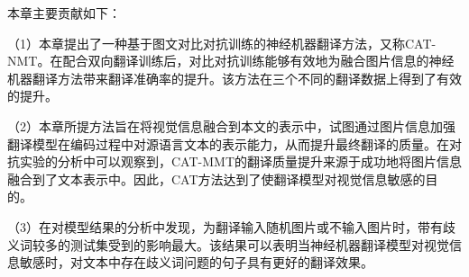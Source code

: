 本章主要贡献如下：

（1）本章提出了一种基于图文对比对抗训练的神经机器翻译方法，又称CAT-NMT。在配合双向翻译训练后，对比对抗训练能够有效地为融合图片信息的神经机器翻译方法带来翻译准确率的提升。该方法在三个不同的翻译数据上得到了有效的提升。

（2）本章所提方法旨在将视觉信息融合到本文的表示中，试图通过图片信息加强翻译模型在编码过程中对源语言文本的表示能力，从而提升最终翻译的质量。在对抗实验的分析中可以观察到，CAT-MMT的翻译质量提升来源于成功地将图片信息融合到了文本表示中。因此，CAT方法达到了使翻译模型对视觉信息敏感的目的。

（3）在对模型结果的分析中发现，为翻译输入随机图片或不输入图片时，带有歧义词较多的测试集受到的影响最大。该结果可以表明当神经机器翻译模型对视觉信息敏感时，对文本中存在歧义词问题的句子具有更好的翻译效果。